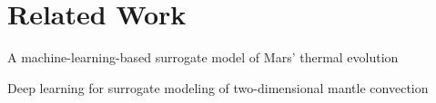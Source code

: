 \chapter{Related Work}\label{chap:relatedWork}

A machine-learning-based surrogate model of Mars’ thermal evolution
\citep{10.1093_gji_ggaa234}

Deep learning for surrogate modeling of two-dimensional mantle convection\citep{10.1103_physrevfluids.6.113801}
